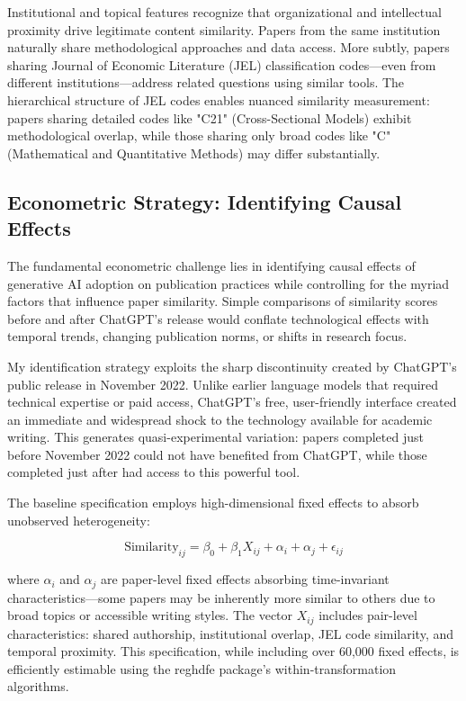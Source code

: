 \documentclass[12pt]{article}
\begin{document}
Institutional and topical features recognize that organizational and intellectual proximity drive legitimate content similarity. Papers from the same institution naturally share methodological approaches and data access. More subtly, papers sharing Journal of Economic Literature (JEL) classification codes—even from different institutions—address related questions using similar tools. The hierarchical structure of JEL codes enables nuanced similarity measurement: papers sharing detailed codes like "C21" (Cross-Sectional Models) exhibit methodological overlap, while those sharing only broad codes like "C" (Mathematical and Quantitative Methods) may differ substantially.

\subsection{Econometric Strategy: Identifying Causal Effects}

The fundamental econometric challenge lies in identifying causal effects of generative AI adoption on publication practices while controlling for the myriad factors that influence paper similarity. Simple comparisons of similarity scores before and after ChatGPT's release would conflate technological effects with temporal trends, changing publication norms, or shifts in research focus.

My identification strategy exploits the sharp discontinuity created by ChatGPT's public release in November 2022. Unlike earlier language models that required technical expertise or paid access, ChatGPT's free, user-friendly interface created an immediate and widespread shock to the technology available for academic writing. This generates quasi-experimental variation: papers completed just before November 2022 could not have benefited from ChatGPT, while those completed just after had access to this powerful tool.

The baseline specification employs high-dimensional fixed effects to absorb unobserved heterogeneity:

\begin{equation}
\text{Similarity}_{ij} = \beta_0 + \beta_1 X_{ij} + \alpha_i + \alpha_j + \epsilon_{ij}
\end{equation}

where $\alpha_i$ and $\alpha_j$ are paper-level fixed effects absorbing time-invariant characteristics—some papers may be inherently more similar to others due to broad topics or accessible writing styles. The vector $X_{ij}$ includes pair-level characteristics: shared authorship, institutional overlap, JEL code similarity, and temporal proximity. This specification, while including over 60,000 fixed effects, is efficiently estimable using the reghdfe package's within-transformation algorithms.
\end{document}
